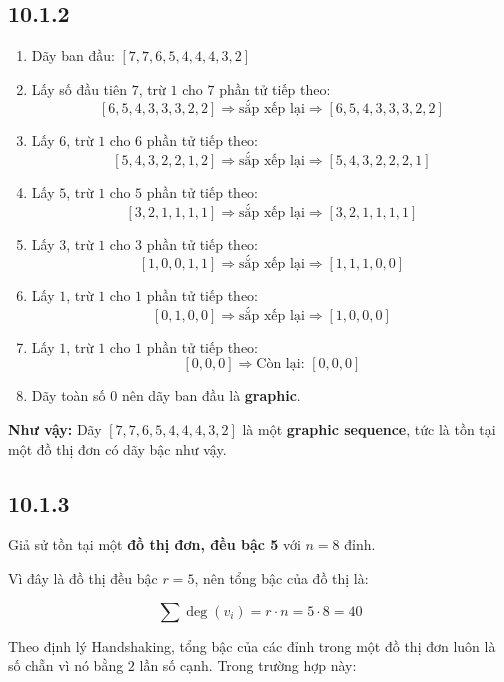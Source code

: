 \documentclass{article}
\begin{document}
	\subsection*{10.1.2}
	\begin{enumerate}
		\item Dãy ban đầu: $[7, 7, 6, 5, 4, 4, 4, 3, 2]$
		
		\item Lấy số đầu tiên $7$, trừ $1$ cho $7$ phần tử tiếp theo:
		\[
		[6, 5, 4, 3, 3, 3, 2, 2] \Rightarrow \text{sắp xếp lại} \Rightarrow [6, 5, 4, 3, 3, 3, 2, 2]
		\]
		
		\item Lấy $6$, trừ $1$ cho $6$ phần tử tiếp theo:
		\[
		[5, 4, 3, 2, 2, 1, 2] \Rightarrow \text{sắp xếp lại} \Rightarrow [5, 4, 3, 2, 2, 2, 1]
		\]
		
		\item Lấy $5$, trừ $1$ cho $5$ phần tử tiếp theo:
		\[
		[3, 2, 1, 1, 1, 1] \Rightarrow \text{sắp xếp lại} \Rightarrow [3, 2, 1, 1, 1, 1]
		\]
		
		\item Lấy $3$, trừ $1$ cho $3$ phần tử tiếp theo:
		\[
		[1, 0, 0, 1, 1] \Rightarrow \text{sắp xếp lại} \Rightarrow [1, 1, 1, 0, 0]
		\]
		
		\item Lấy $1$, trừ $1$ cho $1$ phần tử tiếp theo:
		\[
		[0, 1, 0, 0] \Rightarrow \text{sắp xếp lại} \Rightarrow [1, 0, 0, 0]
		\]
		
		\item Lấy $1$, trừ $1$ cho $1$ phần tử tiếp theo:
		\[
		[0, 0, 0] \Rightarrow \text{Còn lại: } [0, 0, 0]
		\]
		
		\item Dãy toàn số $0$ nên dãy ban đầu là \textbf{graphic}.
	\end{enumerate}
	
	\textbf{Như vậy:} Dãy $[7, 7, 6, 5, 4, 4, 4, 3, 2]$ là một \textbf{graphic sequence}, tức là tồn tại một đồ thị đơn có dãy bậc như vậy.
	
	\subsection*{10.1.3}
	Giả sử tồn tại một \textbf{đồ thị đơn, đều bậc 5} với $n = 8$ đỉnh.
	
	Vì đây là đồ thị đều bậc $r = 5$, nên tổng bậc của đồ thị là:
	
	\[
	\sum \deg(v_i) = r \cdot n = 5 \cdot 8 = 40
	\]
	
	Theo định lý Handshaking, tổng bậc của các đỉnh trong một đồ thị đơn luôn là số chẵn vì nó bằng $2$ lần số cạnh. Trong trường hợp này:
	
\end{document}
